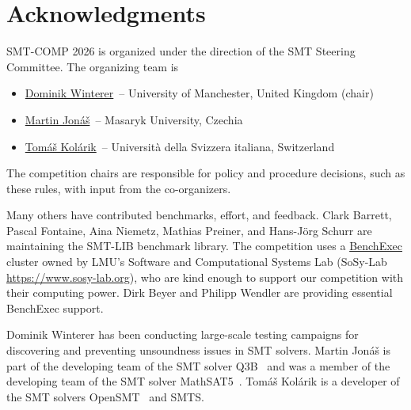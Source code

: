 \documentclass[12pt]{article}
\begin{document}

\section{Acknowledgments}

SMT-COMP 2026 is organized under the direction of the SMT Steering
Committee. The organizing team is
%
\begin{itemize}
\setlength{\itemsep}{0pt}
\item \href{https://wintered.github.io/}{Dominik Winterer}~-- University of Manchester, United Kingdom (chair)
\item \href{https://www.fi.muni.cz/~xjonas/}{Martin Jon\'{a}\v{s}}~-- Masaryk University, Czechia
\item \href{https://usi.to/bisk}{Tomáš Kolárik}~-- Università della Svizzera italiana, Switzerland
\end{itemize}
%
The competition chairs are responsible for policy and procedure decisions,
such as these rules, with input from the co-organizers.

Many others have contributed benchmarks, effort, and feedback.  Clark Barrett,
Pascal Fontaine, Aina Niemetz, Mathias Preiner, and Hans-Jörg Schurr are maintaining the SMT-LIB
benchmark library.
The competition uses a \href{https://github.com/sosy-lab/benchexec}{BenchExec} cluster
owned by LMU's Software and Computational Systems Lab (SoSy-Lab \url{https://www.sosy-lab.org}),
who are kind enough to support our competition with their computing power. Dirk
Beyer and Philipp Wendler are providing essential BenchExec support.

Dominik Winterer has been conducting large-scale testing campaigns for discovering and preventing unsoundness issues in SMT solvers. Martin Jon\'{a}\v{s} is part of the developing team of the SMT solver Q3B~\cite{Q3B} and was a member of the developing team of the SMT solver MathSAT5~\cite{MathSAT5}. Tomáš Kolárik is a developer of the SMT solvers OpenSMT~\cite{opensmt2} and SMTS.


\pagebreak



\end{document}

